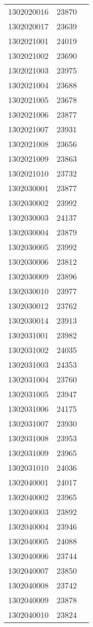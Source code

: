 \begin{longtable}[h]{lcc}
		1302020016 & 23870\\
		1302020017 & 23639\\
		1302021001 & 24019\\
		1302021002 & 23690\\
		1302021003 & 23975\\
		1302021004 & 23688\\
		1302021005 & 23678\\
		1302021006 & 23877\\
		1302021007 & 23931\\
		1302021008 & 23656\\
		1302021009 & 23863\\
		1302021010 & 23732\\
		1302030001 & 23877\\
		1302030002 & 23992\\
		1302030003 & 24137\\
		1302030004 & 23879\\
		1302030005 & 23992\\
		1302030006 & 23812\\
		1302030009 & 23896\\
		1302030010 & 23977\\
		1302030012 & 23762\\
		1302030014 & 23913\\
		1302031001 & 23982\\
		1302031002 & 24035\\
		1302031003 & 24353\\
		1302031004 & 23760\\
		1302031005 & 23947\\
		1302031006 & 24175\\
		1302031007 & 23930\\
		1302031008 & 23953\\
		1302031009 & 23965\\
		1302031010 & 24036\\
		1302040001 & 24017\\
		1302040002 & 23965\\
		1302040003 & 23892\\
		1302040004 & 23946\\
		1302040005 & 24088\\
		1302040006 & 23744\\
		1302040007 & 23850\\
		1302040008 & 23742\\
		1302040009 & 23878\\
		1302040010 & 23824\\

\end{longtable}

